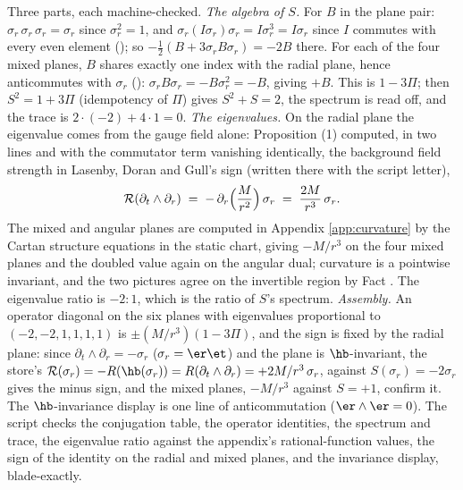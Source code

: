 Three parts, each machine-checked. \emph{The algebra of $S$.} For $B$ in the plane pair: $\sigma_r\,\sigma_r\,\sigma_r = \sigma_r$ since $\sigma_r^2 = 1$, and $\sigma_r (I\sigma_r)\sigma_r = I\sigma_r^3 = I\sigma_r$ since $I$ commutes with every even element (); so $-\tfrac12(B + 3\sigma_r B\sigma_r) = -2B$ there. For each of the four mixed planes, $B$ shares exactly one index with the radial plane, hence anticommutes with $\sigma_r$ (): $\sigma_r B \sigma_r = -B\sigma_r^2 = -B$, giving $+B$. This is $1 - 3\Pi$; then $S^2 = 1 + 3\Pi$ (idempotency of $\Pi$) gives $S^2 + S = 2$, the spectrum is read off, and the trace is $2\cdot(-2) + 4\cdot 1 = 0$. \emph{The eigenvalues.} On the radial plane the eigenvalue comes from the gauge field alone: Proposition (1) computed, in two lines and with the commutator term vanishing identically, the background field strength in Lasenby, Doran and Gull's sign (written there with the script letter),
\[
\mathcal{R}(\partial_t \wedge \partial_r) \;=\; -\,\partial_r\Bigl(\frac{M}{r^2}\Bigr)\,\sigma_r \;=\; \frac{2M}{r^3}\,\sigma_r .
\]
The mixed and angular planes are computed in Appendix \ref{app:curvature} by the Cartan structure equations in the static chart, giving $-M/r^3$ on the four mixed planes and the doubled value again on the angular dual; curvature is a pointwise invariant, and the two pictures agree on the invertible region by Fact . The eigenvalue ratio is $-2 : 1$, which is the ratio of $S$'s spectrum. \emph{Assembly.} An operator diagonal on the six planes with eigenvalues proportional to $(-2,-2,1,1,1,1)$ is $\pm(M/r^3)(1 - 3\Pi)$, and the sign is fixed by the radial plane: since $\partial_t\wedge\partial_r = -\sigma_r$ ($\sigma_r = \er\et$) and the plane is $\hb$-invariant, the store's $\mathcal{R}(\sigma_r) = -R(\hb(\sigma_r)) = R(\partial_t\wedge\partial_r) = +2M/r^{3}\,\sigma_r$, against $S(\sigma_r) = -2\sigma_r$ gives the minus sign, and the mixed planes, $-M/r^{3}$ against $S = +1$, confirm it. The $\hb$-invariance display is one line of anticommutation ($\er \wedge \er = 0$). The script checks the conjugation table, the operator identities, the spectrum and trace, the eigenvalue ratio against the appendix's rational-function values, the sign of the identity on the radial and mixed planes, and the invariance display, blade-exactly.
